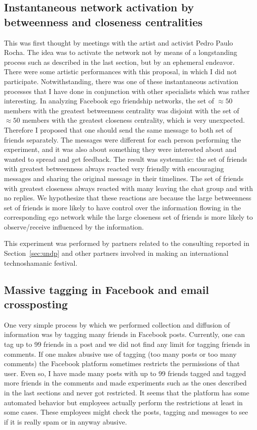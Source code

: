 \begin{apendicesenv}
\subsection{Instantaneous network activation by betweenness and closeness centralities}
This was first thought by meetings with the artist and activist Pedro Paulo Rocha.
The idea was to activate the network not by means of a longstanding process such
as described in the last section, but by an ephemeral endeavor.
There were some artistic performances with this proposal, in which I did
not participate.
Notwithstanding, there was one of these instantaneous activation processes that
I have done in conjunction with other specialists which was rather interesting.
In analyzing Facebook ego friendship networks, the set of $\approx 50$ members with
the greatest betweenness centrality was disjoint with the set of $\approx 50$ members
with the greatest closeness centrality, which is very unexpected.
Therefore I proposed that one should send the same message to both set of friends separately.
The messages were different for each person performing the experiment,
and it was also about something they were interested about and wanted to spread and get feedback.
The result was systematic: the set of friends with greatest betweenness always reacted very friendly
with encouraging messages and sharing the original message in their timelines.
The set of friends with greatest closeness always reacted with many leaving the chat group
and with no replies.
We hypothesize that these reactions are because the large betweenness set of friends is more
likely to have control over the information flowing in the corresponding ego network while
the large closeness set of friends is more likely to observe/receive influenced by the information.

This experiment was performed by partners related to the consulting reported in Section~\ref{sec:undp}
and other partners involved in making an international technoshamanic festival.

\subsection{Massive tagging in Facebook and email crossposting}
One very simple process by which we performed collection and diffusion of information
was by tagging many friends in Facebook posts.
Currently, one can tag up to 99 friends in a post
and we did not find any limit for tagging friends in comments.
If one makes abusive use of tagging (too many posts or too many comments)
the Facebook platform sometimes restricts the permissions of that user.
Even so, I have made many posts with up to 99 friends tagged and tagged more
friends in the comments and made experiments such as the ones described in the
last sections and never got restricted.
It seems that the platform has some automated behavior but employees actually
perform the restrictions at least in some cases.
These employees might check the posts, tagging and messages to see if it is
really spam or in anyway abusive.


\end{apendicesenv}
